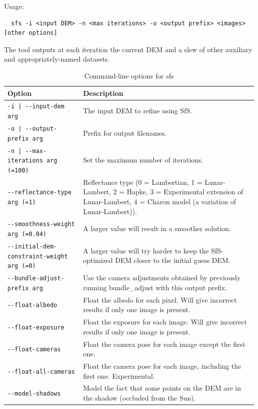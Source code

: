 Usage:
\begin{verbatim}
  sfs -i <input DEM> -n <max iterations> -o <output prefix> <images> [other options]
\end{verbatim}

The tool outputs at each iteration the current DEM and a slew of other auxiliary and 
appropriately-named datasets.

\begin{longtable}{|l|p{7.5cm}|}
\caption{Command-line options for sfs}
\label{tbl:sfs}
\endfirsthead
\endhead
\endfoot
\endlastfoot
\hline
Option & Description \\ \hline \hline
\texttt{-i | -\/-input-dem  arg} & The input DEM to refine using SfS.\\ \hline
\texttt{-o | -\/-output-prefix  arg} & Prefix for output filenames.\\ \hline
\texttt{-n | -\/-max-iterations  arg (=100)} & Set the maximum number of iterations.\\ \hline
\texttt{-\/-reflectance-type arg (=1)} & Reflectance type (0 = Lambertian, 1 = Lunar-Lambert, 2 = Hapke, 3 = Experimental extension of Lunar-Lambert, 4 = Charon model (a variation of Lunar-Lambert)).\\ \hline
\texttt{-\/-smoothness-weight arg (=0.04)} & A larger value will result in a smoother solution.\\ \hline
\texttt{-\/-initial-dem-constraint-weight arg (=0)} & A larger value will try harder to keep the SfS-optimized DEM closer to the initial guess DEM.\\ \hline
\texttt{-\/-bundle-adjust-prefix arg} & Use the camera adjustments obtained by previously running bundle\_adjust with this output prefix.\\ \hline
\texttt{-\/-float-albedo} & Float the albedo for each pixel. Will give incorrect results if only one image is present.\\ \hline
\texttt{-\/-float-exposure} & Float the exposure for each image. Will give incorrect results if only one image is present.\\ \hline
\texttt{-\/-float-cameras} & Float the camera pose for each image except the first one.\\ \hline
\texttt{-\/-float-all-cameras} & Float the camera pose for each image, including the first one. Experimental.\\ \hline
\texttt{-\/-model-shadows} & Model the fact that some points on the DEM are in the shadow (occluded from the Sun).\\ \hline

\end{longtable}
